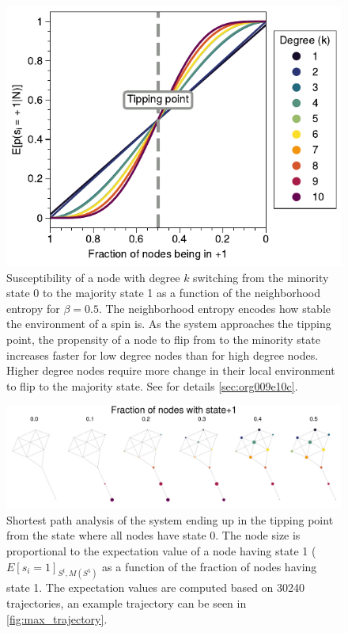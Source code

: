 \documentclass[a4paper, 11pt, twocolumn]{article}
\begin{document}
\begin{figure}[htbp]
\centering
\includegraphics[width=.9\linewidth]{./figures/fig_majority_flip.pdf}
\caption{\label{fig:maj_flip}Susceptibility of a node with degree \(k\) switching from the minority state 0 to the majority state 1 as a function of the neighborhood entropy for \(\beta = 0.5\). The neighborhood entropy encodes how stable the environment of a spin is. As the system approaches the tipping point, the propensity of a node to flip from to the minority state increases faster for low degree nodes than for high degree nodes. Higher degree nodes require more change in their local environment to flip to the majority state. See for details \ref{sec:org009e10c}.}
\end{figure}

\begin{figure}
\centering
\includegraphics[width=.9\linewidth]{./figures/expectation_kite.pdf}
\caption{\label{fig:expectation_kite}Shortest path analysis of the system ending up in the tipping point from the state where all nodes have state 0. The node size is proportional to the expectation value of a node having state 1  (\(E[s_i = 1]_{S^t, M(S^5)}\) as a function of the fraction of nodes having state 1. The expectation values are computed based on 30240 trajectories, an example trajectory can be seen in \cref{fig:max_trajectory}.}
\end{figure}
\end{document}
